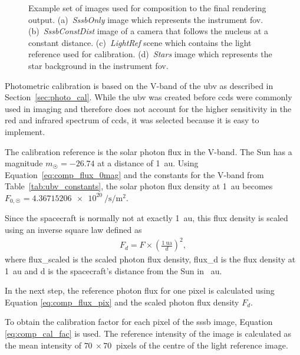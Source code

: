 \begin{figure}[htb]
\begin{subfigure}[b]{0.47\textwidth}
        \caption{}
        \label{fig:comp_stars}
    \end{subfigure}
    \caption{Example set of images used for composition to the final rendering output. (a)~\textit{SssbOnly} image which represents the instrument \gls{fov}. (b)~\textit{SssbConstDist} image of a camera that follows the nucleus at a constant distance. (c)~\textit{LightRef} scene which contains the light reference used for calibration. (d)~\textit{Stars} image which represents the star background in the instrument \gls{fov}.}
    \label{fig:comp_imageset}
\end{figure}

Photometric calibration is based on the V-band of the \gls{ubv} as described in Section~\ref{sec:photo_cal}. While the \gls{ubv} was created before \glspl{ccd} were commonly used in imaging and therefore does not account for the higher sensitivity in the red and infrared spectrum of \glspl{ccd}, it was selected because it is easy to implement.

The calibration reference is the solar photon flux in the V-band. The Sun has a magnitude $m_{\astrosun} = -26.74$ at a distance of \SI{1}{\astronomicalunit}. Using Equation~\ref{eq:comp_flux_0mag} and the constants for the V-band from Table~\ref{tab:ubv_constants}, the solar photon flux density at \SI{1}{\astronomicalunit} becomes $F_{0,\astrosun} = \SI{4.36715206e+20}{\per\second\per\square\meter}$.
 
Since the spacecraft is normally not at exactly \SI{1}{\astronomicalunit}, this flux density is scaled using an inverse square law defined as
\begin{align}
    F_d = F \times \left(\frac{\SI{1}{\astronomicalunit}}{d}\right)^2, \label{eq:inverse_square}
\end{align}
where \gls{flux_scaled} is the scaled photon flux density, \gls{flux_d} is the flux density at \SI{1}{\astronomicalunit} and \gls{d} is the spacecraft's distance from the Sun in \SI{}{\astronomicalunit}.

In the next step, the reference photon flux for one pixel is calculated using Equation \ref{eq:comp_flux_pix} and the scaled photon flux density $F_d$.

To obtain the calibration factor for each pixel of the \gls{sssb} image, Equation \ref{eq:comp_cal_fac} is used. The reference intensity of the image is calculated as the mean intensity of $\SI{70}{}\times\SI{70}{}$ pixels of the centre of the light reference image.

